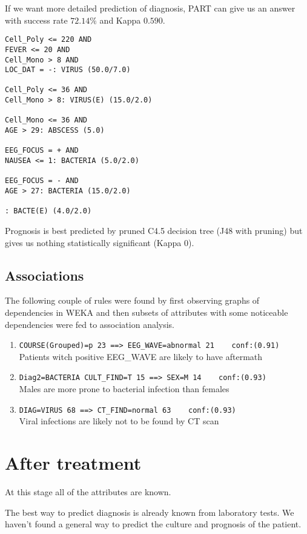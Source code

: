 \documentclass[11pt]{article}
\begin{document}
If we want more detailed prediction of diagnosis, PART can give us an answer
with success rate $72.14\%$ and Kappa $0.590$.
\begin{verbatim}
Cell_Poly <= 220 AND
FEVER <= 20 AND
Cell_Mono > 8 AND
LOC_DAT = -: VIRUS (50.0/7.0)

Cell_Poly <= 36 AND
Cell_Mono > 8: VIRUS(E) (15.0/2.0)

Cell_Mono <= 36 AND
AGE > 29: ABSCESS (5.0)

EEG_FOCUS = + AND
NAUSEA <= 1: BACTERIA (5.0/2.0)

EEG_FOCUS = - AND
AGE > 27: BACTERIA (15.0/2.0)

: BACTE(E) (4.0/2.0)
\end{verbatim}

Prognosis is best predicted by pruned C4.5 decision tree (J48 with pruning) but
gives us nothing statistically significant (Kappa $0$).

\subsection{Associations}
The following couple of rules were found by first observing graphs of
dependencies in WEKA and then subsets of attributes with some noticeable
dependencies were fed to association analysis.
\begin{enumerate}
    \item \verb|COURSE(Grouped)=p 23 ==> EEG_WAVE=abnormal 21    conf:(0.91)| \\
          Patients witch positive EEG\_WAVE are likely to have aftermath
    \item \verb|Diag2=BACTERIA CULT_FIND=T 15 ==> SEX=M 14    conf:(0.93)| \\
          Males are more prone to bacterial infection than females
      \item \verb|DIAG=VIRUS 68 ==> CT_FIND=normal 63    conf:(0.93)| \\
          Viral infections are likely not to be found by CT scan

\end{enumerate}

\section{After treatment}
At this stage all of the attributes are known. 

The best way to predict diagnosis is already known from laboratory tests.  We
haven't found a general way to predict the culture and prognosis of the
patient.
\end{document}

